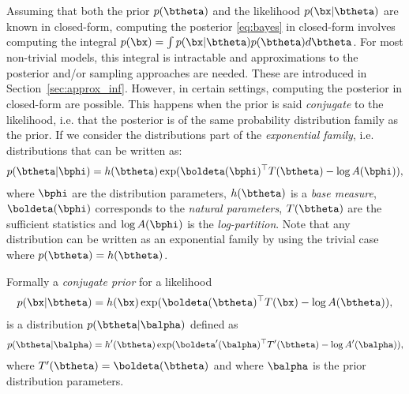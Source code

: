 Assuming that both the prior $p(\btheta)$ and the likelihood $p(\bx|\btheta)$ are known in closed-form, computing the posterior \eqref{eq:bayes} in closed-form involves computing the integral $p(\bx)=\int p(\bx|\btheta)p(\btheta)d\btheta$.
For most non-trivial models, this integral is intractable and approximations to the posterior and/or sampling approaches are needed.
These are introduced in Section~\ref{sec:approx_inf}.
However, in certain settings, computing the posterior in closed-form are possible.
This happens when the prior is said \textit{conjugate} to the likelihood, i.e. that the posterior is of the same probability distribution family as the prior.
If we consider the distributions part of the \textit{exponential family}, i.e. distributions that can be written as:
\begin{align}
    p(\btheta|\bphi) = h(\btheta)\exp(\boldeta(\bphi)^\top T(\btheta) - \log A(\bphi)),
    \label{eq:expfamily}
\end{align}
where $\bphi$ are the distribution parameters, $h(\btheta)$ is a \textit{base measure}, $\boldeta(\bphi)$ corresponds to the \textit{natural parameters}, $T(\btheta)$ are the sufficient statistics and $\log A(\bphi)$ is the \textit{log-partition}.
Note that any distribution can be written as an exponential family by using the trivial case where $p(\btheta) =h(\btheta)$.

Formally a \textit{conjugate prior} for a likelihood
\begin{align*}
    p(\bx|\btheta) = h(\bx)\exp(\boldeta(\btheta)^\top T(\bx) - \log A(\btheta)),
\end{align*}
is a distribution $p(\btheta|\balpha)$ defined as
\begin{align*}
    p(\btheta|\balpha) = h'(\btheta)\exp(\boldeta'(\balpha)^\top T'(\btheta) - \log A'(\balpha)),
\end{align*}
where $T'(\btheta) = \boldeta(\btheta)$ and where $\balpha$ is the prior distribution parameters.




